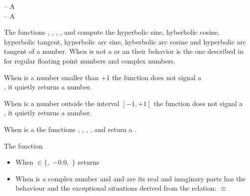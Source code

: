 \documentclass[../Exponentials-Logarithms-Trigonometry.tex]{subfiles}
\begin{document}

\DSyntax{}

  \RArrow {}\\
  \RArrow {}\\
  \RArrow {}\\
  \RArrow {}\\
  \RArrow {}\\
  \RArrow {}

\DArgsNValues{}

 -- A \\
 -- A 

\DDescription{}

The functions , , , ,
 and  compute the hyperbolic
sine, hyberbolic cosine, hyperbolic tangent, hyperbolic
arc sine, hyberbolic arc cosine and hyperbolic arc tangent of a number. When
 is not a  or an
 their behavior is the one described in
\cite{1996:ANSIHyperSpec} for regular floating point numbers and complex
numbers.

\noindent
When  is a  number smaller than $+1$ the function
 does not signal a \\, it
quietly returns a  number.

\noindent
When  is a  number outside the interval $[-1, +1]$
the function  does not signal a \\
, it quietly
returns a  number.

\noindent
When  is a  the functions ,
, , ,  and  return
a .

\noindent
The function 
\begin{itemize}
\item When  $\in \{$$,$
  $-0.0$$,$ $\}$ returns 
\item When  is a complex number and   and 
  are its real and imaginary parts has the behaviour and the exceptional
  situations derived from the relation: \code{)}
  $\equiv$ \code{ (-
  }\code{)))}
\end{itemize}
\end{document}

